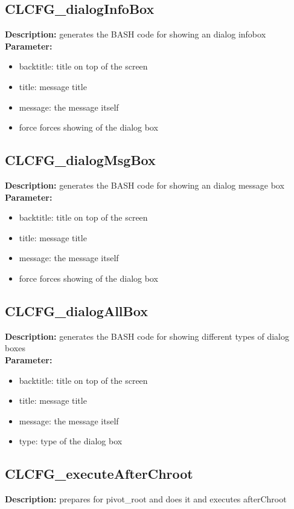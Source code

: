 \subsection{CLCFG\_dialogInfoBox}
\textbf{Description:} generates the BASH code for showing an dialog infobox\\
\textbf{Parameter:}
\begin{itemize}
\item backtitle: title on top of the screen
\item title: message title
\item message: the message itself
\item force forces showing of the dialog box
\end{itemize}

\subsection{CLCFG\_dialogMsgBox}
\textbf{Description:} generates the BASH code for showing an dialog message box\\
\textbf{Parameter:}
\begin{itemize}
\item backtitle: title on top of the screen
\item title: message title
\item message: the message itself
\item force forces showing of the dialog box
\end{itemize}

\subsection{CLCFG\_dialogAllBox}
\textbf{Description:} generates the BASH code for showing different types of dialog boxes\\
\textbf{Parameter:}
\begin{itemize}
\item backtitle: title on top of the screen
\item title: message title
\item message: the message itself
\item type: type of the dialog box
\end{itemize}

\subsection{CLCFG\_executeAfterChroot}
\textbf{Description:} prepares for pivot\_root and does it and executes afterChroot\\

